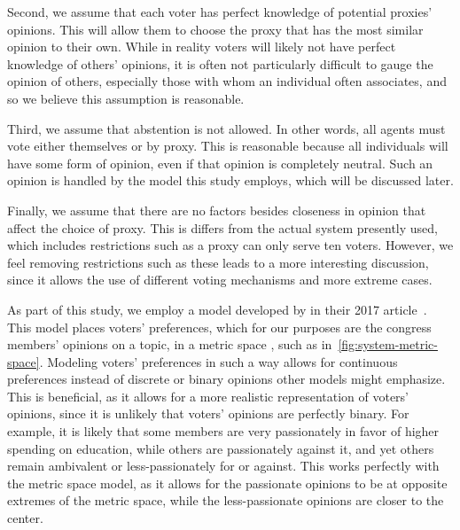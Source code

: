 Second, we assume that each voter has perfect knowledge of potential proxies' opinions.
This will allow them to choose the proxy that has the most similar opinion to their own.
While in reality voters will likely not have perfect knowledge of others' opinions,
it is often not particularly difficult to gauge the opinion of others, especially
those with whom an individual often associates, and so we believe this assumption is
reasonable.

Third, we assume that abstention is not allowed.
In other words, all agents must vote either themselves or by proxy.
This is reasonable because all individuals will have some form of opinion, even if
that opinion is completely neutral.
Such an opinion is handled by the model this study employs, which will be discussed
later.

Finally, we assume that there are no factors besides closeness in opinion that affect
the choice of proxy.
This is differs from the actual system presently used, which includes restrictions
such as a proxy can only serve ten voters.\cite{CERP2020}
However, we feel removing restrictions such as these leads to a more interesting
discussion, since it allows the use of different voting mechanisms and more extreme
cases.

As part of this study, we employ a model developed by  in
their 2017 article~\cite{Cohensius2017}.
This model places voters' preferences, which for our purposes are the congress
members' opinions on a topic, in a metric space \systemspace, such as
in~\autoref{fig:system-metric-space}.
Modeling voters' preferences in such a way allows for continuous preferences instead of
discrete or binary opinions other models might emphasize.
This is beneficial, as it allows for a more realistic representation of voters'
opinions, since it is unlikely that voters' opinions are perfectly binary.
For example, it is likely that some members are very passionately in favor of higher
spending on education, while others are passionately against it, and yet others
remain ambivalent or less-passionately for or against.
This works perfectly with the metric space model, as it allows for the passionate
opinions to be at opposite extremes of the metric space, while the less-passionate
opinions are closer to the center.

